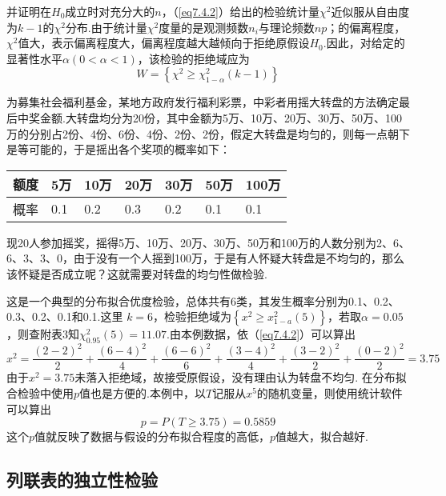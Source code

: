 并证明在$H_{0}$成立时对充分大的$n$，（\ref{eq7.4.2}）给出的检验统计量$\chi^{2}$近似服从自由度为$k-1$的$\chi^{2}$分布.由于统计量$\chi^{2}$度量的是观测频数$n_{i}$与理论频数$np$；的偏离程度，$\chi^{2}$值大，表示偏离程度大，偏离程度越大越倾向于拒绝原假设$H_{0}$.因此，对给定的显著性水平$\alpha(0<\alpha<1)$，该检验的拒绝域应为
\begin{equation}\label{eq7.4.3}
W=\left\{\chi^2\geq\chi_{1-\alpha}^{2}\left(k-1\right)\right\}
\end{equation}
\begin{example}\label{exam7.4.1}
	为募集社会福利基金，某地方政府发行福利彩票，中彩者用摇大转盘的方法确定最后中奖金额.大转盘均分为20份，其中金额为5万、10万、20万、30万、50万、100万的分别占2份、4份、6份、4份、2份、2份，假定大转盘是均匀的，则每一点朝下是等可能的，于是摇出各个奖项的概率如下：
	
	\begin{table}[!htp]
		\centering
		\begin{tabularx}{1.0\textwidth}{Z|ZZZZZZ}
			额度&5万&10万&20万&30万&50万&100万\\
			\midrule
			概率&0.1&0.2&0.3&0.2&0.1&0.1
		\end{tabularx}
	\end{table}
	现20人参加摇奖，摇得5万、10万、20万、30万、50万和100万的人数分别为2、6、6、3、3、0，由于没有一个人摇到100万，于是有人怀疑大转盘是不均匀的，那么该怀疑是否成立呢？这就需要对转盘的均匀性做检验.
\end{example}
\begin{solution}

这是一个典型的分布拟合优度检验，总体共有6类，其发生概率分别为0.1、0.2、0.3、0.2、0.1和0.1.这里 $k=6$，检验拒绝域为$\left\{ x ^ { 2 } \geq x _ { 1 - a } ^ { 2 } ( 5 ) \right\}$，若取$\alpha=0.05$，则查附表3知$\chi _ { 0.95 } ^ { 2 } ( 5 ) = 11.07$.由本例数据，依（\ref{eq7.4.2}）可以算出
\[x ^ { 2 } = \frac { ( 2 - 2 ) ^ { 2 } } { 2 } + \frac { ( 6 - 4 ) ^ { 2 } } { 4 } + \frac { ( 6 - 6 ) ^ { 2 } } { 6 } + \frac { ( 3 - 4 ) ^ { 2 } } { 4 } +\frac { ( 3 - 2 ) ^ { 2 } } { 2 } + \frac { ( 0 - 2 ) ^ { 2 } } { 2 } = 3.75\]
由于$x ^ { 2 } = 3.75$未落入拒绝域，故接受原假设，没有理由认为转盘不均匀.
在分布拟合检验中使用$p$值也是方便的.本例中，以$T$记服从$x ^ {5}$的随机变量，则使用统计软件可以算出
\[p = P ( T \geq 3.75 ) = 0.5859\]
这个$p$值就反映了数据与假设的分布拟合程度的高低，$p$值越大，拟合越好.
\end{solution}
\subsection{列联表的独立性检验\label{sec:7.3.2}}
